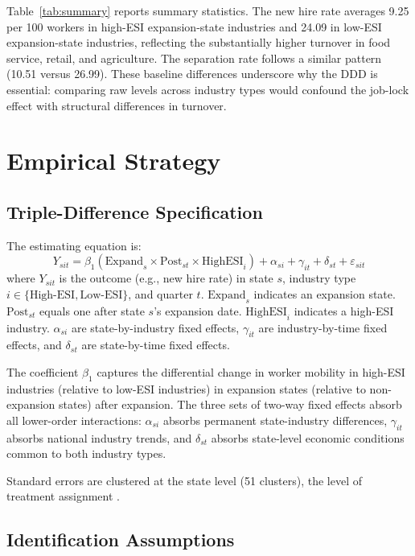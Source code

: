 \documentclass[12pt]{article}
\begin{document}
Table~\ref{tab:summary} reports summary statistics. The new hire rate averages 9.25 per 100 workers in high-ESI expansion-state industries and 24.09 in low-ESI expansion-state industries, reflecting the substantially higher turnover in food service, retail, and agriculture. The separation rate follows a similar pattern (10.51 versus 26.99). These baseline differences underscore why the DDD is essential: comparing raw levels across industry types would confound the job-lock effect with structural differences in turnover.

\section{Empirical Strategy}

\subsection{Triple-Difference Specification}

The estimating equation is:
\begin{equation}
Y_{sit} = \beta_1 (\text{Expand}_s \times \text{Post}_{st} \times \text{HighESI}_i) + \alpha_{si} + \gamma_{it} + \delta_{st} + \varepsilon_{sit}
\label{eq:ddd}
\end{equation}
where $Y_{sit}$ is the outcome (e.g., new hire rate) in state $s$, industry type $i \in \{\text{High-ESI}, \text{Low-ESI}\}$, and quarter $t$. $\text{Expand}_s$ indicates an expansion state. $\text{Post}_{st}$ equals one after state $s$'s expansion date. $\text{HighESI}_i$ indicates a high-ESI industry. $\alpha_{si}$ are state-by-industry fixed effects, $\gamma_{it}$ are industry-by-time fixed effects, and $\delta_{st}$ are state-by-time fixed effects.

The coefficient $\beta_1$ captures the differential change in worker mobility in high-ESI industries (relative to low-ESI industries) in expansion states (relative to non-expansion states) after expansion. The three sets of two-way fixed effects absorb all lower-order interactions: $\alpha_{si}$ absorbs permanent state-industry differences, $\gamma_{it}$ absorbs national industry trends, and $\delta_{st}$ absorbs state-level economic conditions common to both industry types.

Standard errors are clustered at the state level (51 clusters), the level of treatment assignment \citep{abadie2018economic}.

\subsection{Identification Assumptions}
\end{document}
